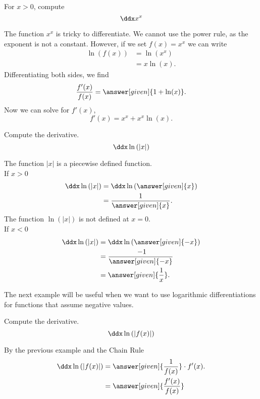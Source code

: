 \documentclass{ximera}
\begin{document}
\begin{example}

For  $x>0$, compute 
\[
\ddx x^x
\]

\begin{explanation}

The function $x^x$ is tricky to differentiate. We cannot use the power
rule, as the exponent is not a constant. However, if we set $f(x) = x^x$ we can write
\begin{align*}
\ln(f(x)) &= \ln\left(x^x\right)\\
&=x\ln(x).
\end{align*}
Differentiating both sides, we find
\[
\frac{f'(x)}{f(x)} = \answer[given]{1 + \ln(x)}.
\]
Now we can solve for $f'(x)$, 
\[
f'(x) = x^x + x^x\ln(x).
\]
\end{explanation}
\end{example}


\begin{example}
\author{Nela Lakos}
Compute the derivative.
\[
\ddx\ln{(|x|)}
\]
\begin{explanation}

The function $|x|$ is a piecewise defined function. \\

If $x>0$
\begin{align*}
\ddx\ln{(|x|)} &= \ddx\ln{(\answer[given]{x})}\\
&=\dfrac{1}{\answer[given]{x}}.
\end{align*}
The function $\ln{(|x|)}$ is not defined at $x=0$.\\

 If $x<0$
\begin{align*}
\ddx\ln{(|x|)} &= \ddx\ln{(\answer[given]{-x})}\\
&=\dfrac{\ -1}{\answer[given]{-x}}\\
&=\answer[given]{\dfrac{1}{x}}.
\end{align*}
\end{explanation}
\end{example}

The next  example will be useful when we want to use logarithmic differentiations for functions that  assume negative values. 


\begin{example}
\author{Nela Lakos}
Compute the derivative.
\[
\ddx\ln{(|f(x)|)}
\]
\begin{explanation}
By the previous example and the Chain Rule
\begin{align*}
\ddx\ln{(|f(x)|)} &=\answer[given]{\dfrac{1}{f(x)}}\cdot f'(x).\\
&=\answer[given]{\dfrac{f'(x)}{f(x)}}
\end{align*}
\end{explanation}
\end{example}
\end{document}
